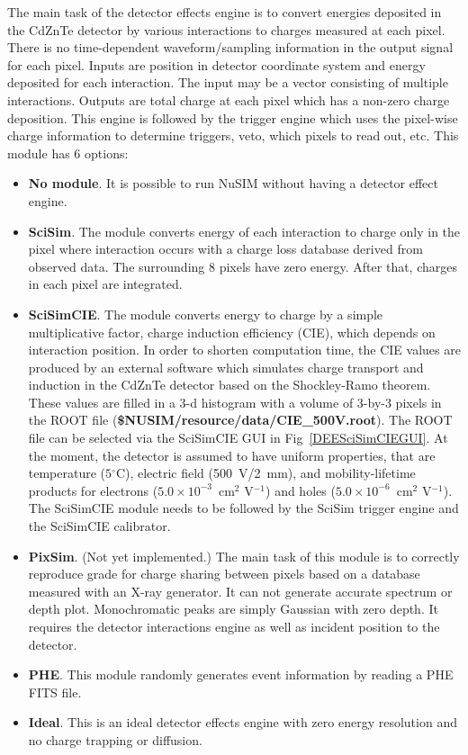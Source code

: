 The main task of the detector effects engine is to convert energies
deposited in the CdZnTe detector by various interactions to charges
measured at each pixel.
There is no time-dependent waveform/sampling information in the output
signal for each pixel.
Inputs are position in detector coordinate system and energy
deposited for each interaction.
The input may be a vector consisting of multiple interactions.
Outputs are total charge at each pixel which has a non-zero charge
deposition.
This engine is followed by the trigger engine which uses the pixel-wise
charge information to determine triggers, veto, which pixels to read
out, etc. This module has 6 options:
\begin{itemize}
 \item \textbf{No module}.
       It is possible to run NuSIM without having a detector effect engine.
 \item \textbf{SciSim}.
       The module converts energy of each interaction to charge only
       in the pixel where interaction occurs with a charge loss database
       derived from observed data.
       The surrounding 8 pixels have zero energy.
       After that, charges in each pixel are integrated.
 \item \textbf{SciSimCIE}.
       The module converts energy to charge
       by a simple multiplicative factor, charge induction efficiency
       (CIE), which depends on interaction position.
       In order to shorten computation time, the CIE values are produced
       by an external software which simulates charge transport and
       induction in the CdZnTe detector based on the Shockley-Ramo theorem.
       These values are filled in a 3-d histogram with a volume of 3-by-3
       pixels in the ROOT file
       (\textbf{\${NUSIM}/resource/data/CIE\_500V.root}).
       The ROOT file can be selected via the SciSimCIE GUI in
       Fig~\ref{DEESciSimCIEGUI}.
       At the moment, the detector is assumed to have uniform properties,
       that are temperature ($5{}^\circ\mathrm{C}$),
       electric field (500~V/2~mm), and mobility-lifetime products for
       electrons ($5.0 \times 10^{-3}$~cm$^{2}$ V$^{-1}$)
       and holes ($5.0 \times 10^{-6}$~cm$^{2}$ V$^{-1}$).
       The SciSimCIE module needs to be followed by the SciSim trigger
       engine and the SciSimCIE calibrator.
 \item \textbf{PixSim}.
       (Not yet implemented.)
       The main task of this module is to correctly reproduce grade for
       charge sharing between pixels based on a database measured with
       an X-ray generator. It can not generate accurate spectrum or depth
       plot. Monochromatic peaks are simply Gaussian with zero depth.
       It requires the detector interactions engine as well as incident
       position to the detector.
 \item \textbf{PHE}.
       This module randomly generates event information by reading
       a PHE FITS file.
 \item \textbf{Ideal}.
       This is an ideal detector effects engine with zero energy
       resolution and no charge trapping or diffusion.
\end{itemize}

